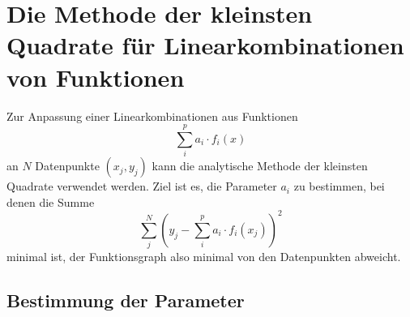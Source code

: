 \documentclass{scrartcl}
\begin{document}
\section*{Die Methode der kleinsten Quadrate für Linearkombinationen von Funktionen}

Zur Anpassung einer Linearkombinationen aus Funktionen
\begin{equation}
  \sum_i^p a_i \cdot f_i(x)
\end{equation}
an $N$ Datenpunkte $(x_j, y_j)$ kann die analytische Methode der kleinsten Quadrate verwendet werden.
Ziel ist es, die Parameter $a_i$ zu bestimmen, bei denen die Summe
\begin{equation}
  \sum_j^N\left( y_j - \sum_i^p a_i\cdot f_i(x_j)\right)^{\!\!\! 2}
\end{equation}
minimal ist, der Funktionsgraph also minimal von den Datenpunkten abweicht.

\subsection*{Bestimmung der Parameter}
\end{document}
